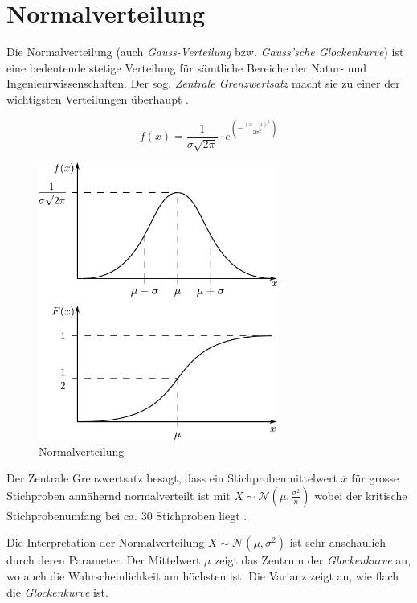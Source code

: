 \newpage
\section{Normalverteilung}
Die Normalverteilung (auch \emph{Gauss-Verteilung} bzw. 
\emph{Gauss'sche Glockenkurve}) ist eine bedeutende stetige
Verteilung für sämtliche Bereiche der Natur- und 
Ingenieurwissenschaften. Der sog. \emph{Zentrale Grenzwertsatz}
macht sie zu einer der wichtigsten Verteilungen überhaupt
\parencite[297]{henze}. 


\[ 
	f(x) = \frac{1}{\sigma\sqrt{2\pi}}\cdot e^{
		\left( -\frac{(x-\mu)^2}{2\sigma^2} \right)}
\]

\begin{figure}[h!]
	\centering
	\includegraphics[width=0.7\textwidth]{normal.pdf}
	\caption{Normalverteilung}
	\label{fig:normal}
\end{figure}

\noindent
Der Zentrale Grenzwertsatz besagt,
dass ein Stichprobenmittelwert $\overline{x}$ für grosse
Stichproben annähernd normalverteilt ist mit 
$\overline{X}\sim\mathcal{N}(\mu, \frac{\sigma^2}{n})$ 
wobei der kritische Stichprobenumfang bei ca. 30 Stichproben
liegt \parencite[481]{oreilly}.


Die Interpretation der Normalverteilung 
$X \sim \mathcal{N}(\mu, \sigma^2)$
ist sehr anschaulich durch deren Parameter. Der Mittelwert 
$\mu$ zeigt das Zentrum der \emph{Glockenkurve} an, wo auch die 
Wahrscheinlichkeit am höchsten ist. Die Varianz zeigt an, wie 
flach die \emph{Glockenkurve} ist. 

